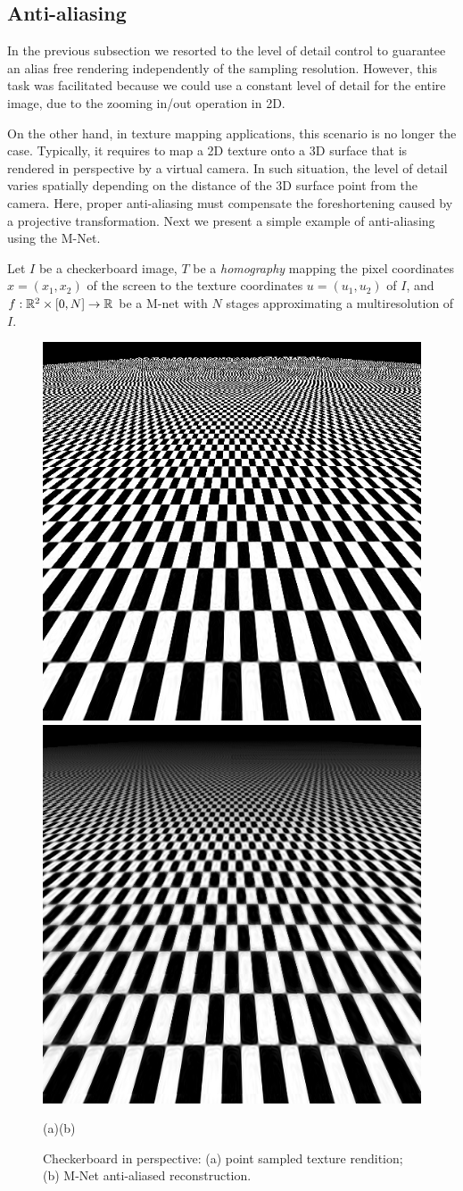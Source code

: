 \subsection{Anti-aliasing}

In the previous subsection we resorted to the level of detail control to guarantee an alias free rendering independently of the sampling resolution. However, this task was facilitated because we could use a constant level of detail for the entire image, due to the zooming in/out operation in 2D.

On the other hand, in texture mapping applications, this scenario is no longer the case. Typically, it requires to map a 2D texture onto a 3D surface that is rendered in perspective by a virtual camera. In such situation, the level of detail varies spatially depending on the distance of the 3D surface point from the camera. Here, proper anti-aliasing must compensate the foreshortening caused by a projective transformation. Next we present a simple example of anti-aliasing using the M-Net.

Let $I$ be a checkerboard image, $T$ be a \textit{homography} mapping the pixel coordinates $x=(x_1,x_2)$ of the screen to the texture coordinates $u=(u_1,u_2)$ of $I$, and $f:\mathbb{R}^2\times [0,N]\to \mathbb{R}$ be a M-net with $N$ stages approximating a multiresolution of $I$. 

\begin{figure}[!h]
\centering
\includegraphics[width=0.46\linewidth]{img/ch5/im_0_alias.png}
\includegraphics[width=0.46\linewidth]{img/ch5/im_0_anti_alias.png}
\centerline{(a)\hfil\hfil(b)}
\caption{Checkerboard in perspective: (a) point sampled texture rendition; (b) M-Net anti-aliased reconstruction.}
\label{f:alias}
\end{figure}

